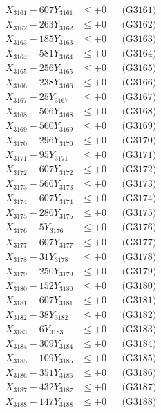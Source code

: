 \documentclass[a4paper,10pt]{article}
\begin{document}
{\begin{align}
\allowbreak
X_{3161} - 607Y_{3161} &\leq +0 && \text{(G3161)} \\
X_{3162} - 263Y_{3162} &\leq +0 && \text{(G3162)} \\
X_{3163} - 185Y_{3163} &\leq +0 && \text{(G3163)} \\
X_{3164} - 581Y_{3164} &\leq +0 && \text{(G3164)} \\
X_{3165} - 256Y_{3165} &\leq +0 && \text{(G3165)} \\
X_{3166} - 238Y_{3166} &\leq +0 && \text{(G3166)} \\
X_{3167} - 25Y_{3167} &\leq +0 && \text{(G3167)} \\
X_{3168} - 506Y_{3168} &\leq +0 && \text{(G3168)} \\
X_{3169} - 560Y_{3169} &\leq +0 && \text{(G3169)} \\
X_{3170} - 296Y_{3170} &\leq +0 && \text{(G3170)} \\
\allowbreak
X_{3171} - 95Y_{3171} &\leq +0 && \text{(G3171)} \\
X_{3172} - 607Y_{3172} &\leq +0 && \text{(G3172)} \\
X_{3173} - 566Y_{3173} &\leq +0 && \text{(G3173)} \\
X_{3174} - 607Y_{3174} &\leq +0 && \text{(G3174)} \\
X_{3175} - 286Y_{3175} &\leq +0 && \text{(G3175)} \\
X_{3176} - 5Y_{3176} &\leq +0 && \text{(G3176)} \\
X_{3177} - 607Y_{3177} &\leq +0 && \text{(G3177)} \\
X_{3178} - 31Y_{3178} &\leq +0 && \text{(G3178)} \\
X_{3179} - 250Y_{3179} &\leq +0 && \text{(G3179)} \\
X_{3180} - 152Y_{3180} &\leq +0 && \text{(G3180)} \\
\allowbreak
X_{3181} - 607Y_{3181} &\leq +0 && \text{(G3181)} \\
X_{3182} - 38Y_{3182} &\leq +0 && \text{(G3182)} \\
X_{3183} - 6Y_{3183} &\leq +0 && \text{(G3183)} \\
X_{3184} - 309Y_{3184} &\leq +0 && \text{(G3184)} \\
X_{3185} - 109Y_{3185} &\leq +0 && \text{(G3185)} \\
X_{3186} - 351Y_{3186} &\leq +0 && \text{(G3186)} \\
X_{3187} - 432Y_{3187} &\leq +0 && \text{(G3187)} \\
X_{3188} - 147Y_{3188} &\leq +0 && \text{(G3188)} \\

\end{align}}
\end{document}
